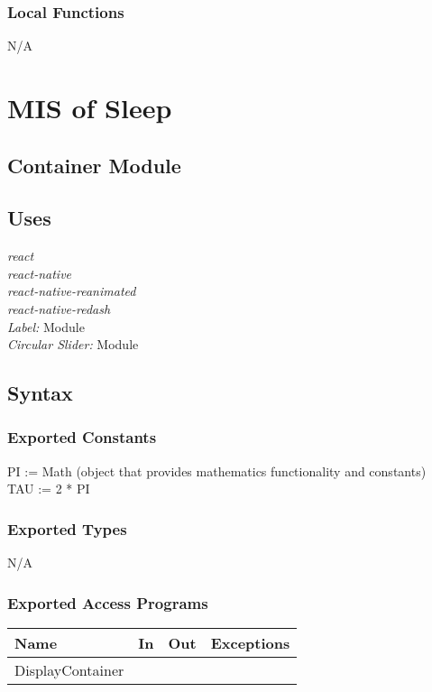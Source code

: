 \documentclass[12pt, titlepage]{article}
\begin{document}
\subsubsection{Local Functions}

N/A

\section{MIS of Sleep} \label{Module} 

\subsection{Container Module}

\subsection{Uses}
{\textit{react}}\\
{\textit{react-native}}\\
{\textit{react-native-reanimated}}\\
{\textit{react-native-redash}}\\
{\textit{Label:} Module}\\
{\textit{Circular Slider:} Module}

\subsection{Syntax}

\subsubsection{Exported Constants}
PI := Math (object that provides mathematics functionality and constants)\\
TAU := 2 * PI
\subsubsection{Exported Types}
N/A

\subsubsection{Exported Access Programs}

\begin{tabular}{| l | l | l | l |}
	\hline
	{\textbf{Name}} & {\textbf{In}} & {\textbf{Out}} & {\textbf{Exceptions}}\\
	\hline
	{DisplayContainer} & & & \\
	\hline
\end{tabular}
\end{document}

